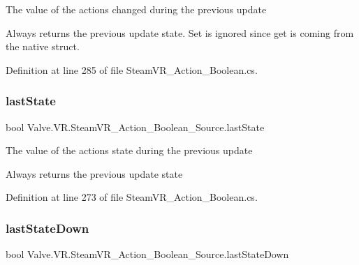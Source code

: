 The value of the action\textquotesingle{}s \textquotesingle{}changed\textquotesingle{} during the previous update 

Always returns the previous update state. Set is ignored since get is coming from the native struct.

Definition at line 285 of file Steam\+V\+R\+\_\+\+Action\+\_\+\+Boolean.\+cs.

\mbox{\label{class_valve_1_1_v_r_1_1_steam_v_r___action___boolean___source_ab00750875aeedfa74cd7ce19ecae2bac}} 
\subsubsection{\texorpdfstring{lastState}{lastState}}
{\footnotesize\ttfamily bool Valve.\+V\+R.\+Steam\+V\+R\+\_\+\+Action\+\_\+\+Boolean\+\_\+\+Source.\+last\+State\hspace{0.3cm}{\ttfamily [get]}}



The value of the action\textquotesingle{}s \textquotesingle{}state\textquotesingle{} during the previous update 

Always returns the previous update state

Definition at line 273 of file Steam\+V\+R\+\_\+\+Action\+\_\+\+Boolean.\+cs.

\mbox{\label{class_valve_1_1_v_r_1_1_steam_v_r___action___boolean___source_ae8ca6561a610cd2484229b1a8ff99911}} 
\subsubsection{\texorpdfstring{lastStateDown}{lastStateDown}}
{\footnotesize\ttfamily bool Valve.\+V\+R.\+Steam\+V\+R\+\_\+\+Action\+\_\+\+Boolean\+\_\+\+Source.\+last\+State\+Down\hspace{0.3cm}{\ttfamily [get]}}



